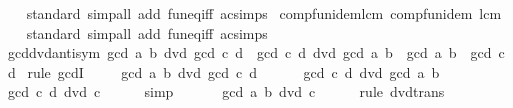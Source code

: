 \begin{isabellebody}
%
\isadelimproof
\ \ %
\endisadelimproof
%
\isatagproof
{}\isamarkupfalse%
\ standard\ {\isacharparenleft}{\kern0pt}simp{\isacharunderscore}{\kern0pt}all\ add{\isacharcolon}{\kern0pt}\ fun{\isacharunderscore}{\kern0pt}eq{\isacharunderscore}{\kern0pt}iff\ ac{\isacharunderscore}{\kern0pt}simps{\isacharparenright}{\kern0pt}%
\endisatagproof
{\isafoldproof}%
%
\isadelimproof
\isanewline
%
\endisadelimproof
\isanewline
{}\isamarkupfalse%
\ comp{\isacharunderscore}{\kern0pt}fun{\isacharunderscore}{\kern0pt}idem{\isacharunderscore}{\kern0pt}lcm{\isacharcolon}{\kern0pt}\ {\isachardoublequoteopen}comp{\isacharunderscore}{\kern0pt}fun{\isacharunderscore}{\kern0pt}idem\ lcm{\isachardoublequoteclose}\isanewline
%
\isadelimproof
\ \ %
\endisadelimproof
%
\isatagproof
{}\isamarkupfalse%
\ standard\ {\isacharparenleft}{\kern0pt}simp{\isacharunderscore}{\kern0pt}all\ add{\isacharcolon}{\kern0pt}\ fun{\isacharunderscore}{\kern0pt}eq{\isacharunderscore}{\kern0pt}iff\ ac{\isacharunderscore}{\kern0pt}simps{\isacharparenright}{\kern0pt}%
\endisatagproof
{\isafoldproof}%
%
\isadelimproof
\isanewline
%
\endisadelimproof
\isanewline
{}\isamarkupfalse%
\ gcd{\isacharunderscore}{\kern0pt}dvd{\isacharunderscore}{\kern0pt}antisym{\isacharcolon}{\kern0pt}\ {\isachardoublequoteopen}gcd\ a\ b\ dvd\ gcd\ c\ d\ {\isasymLongrightarrow}\ gcd\ c\ d\ dvd\ gcd\ a\ b\ {\isasymLongrightarrow}\ gcd\ a\ b\ {\isacharequal}{\kern0pt}\ gcd\ c\ d{\isachardoublequoteclose}\isanewline
%
\isadelimproof
%
\endisadelimproof
%
\isatagproof
{}\isamarkupfalse%
\ {\isacharparenleft}{\kern0pt}rule\ gcdI{\isacharparenright}{\kern0pt}\isanewline
\ \ \isamarkupfalse%
\ {\isacharasterisk}{\kern0pt}{\isacharcolon}{\kern0pt}\ {\isachardoublequoteopen}gcd\ a\ b\ dvd\ gcd\ c\ d{\isachardoublequoteclose}\isanewline
\ \ \ \ \ {\isacharasterisk}{\kern0pt}{\isacharasterisk}{\kern0pt}{\isacharcolon}{\kern0pt}\ {\isachardoublequoteopen}gcd\ c\ d\ dvd\ gcd\ a\ b{\isachardoublequoteclose}\isanewline
\ \ \isamarkupfalse%
\ {\isachardoublequoteopen}gcd\ c\ d\ dvd\ c{\isachardoublequoteclose}\isanewline
\ \ \ \ \isamarkupfalse%
\ simp\isanewline
\ \ \isamarkupfalse%
\ {\isacharasterisk}{\kern0pt}\ \isamarkupfalse%
\ {\isachardoublequoteopen}gcd\ a\ b\ dvd\ c{\isachardoublequoteclose}\isanewline
\ \ \ \ \isamarkupfalse%
\ {\isacharparenleft}{\kern0pt}rule\ dvd{\isacharunderscore}{\kern0pt}trans{\isacharparenright}{\kern0pt}\isanewline
\ \ \isamarkupfalse%

\end{isabellebody}
